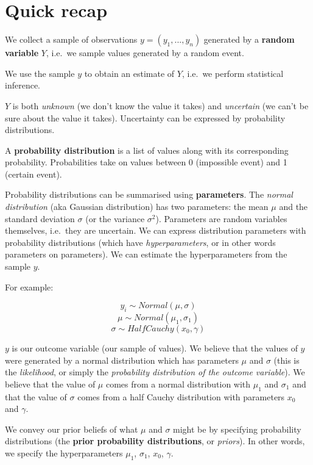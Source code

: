 \documentclass[
]{article}
\begin{document}
\hypertarget{quick-recap}{%
\section{Quick recap}\label{quick-recap}}

We collect a sample of observations \(y = (y_1, ..., y_n)\) generated by
a \textbf{random variable} \(Y\), i.e.~we sample values generated by a
random event.

We use the sample \(y\) to obtain an estimate of \(Y\), i.e.~we perform
statistical inference.

\(Y\) is both \emph{unknown} (we don't know the value it takes) and
\emph{uncertain} (we can't be sure about the value it takes).
Uncertainty can be expressed by probability distributions.

A \textbf{probability distribution} is a list of values along with its
corresponding probability. Probabilities take on values between 0
(impossible event) and 1 (certain event).

Probability distributions can be summarised using \textbf{parameters}.
The \emph{normal distribution} (aka Gaussian distribution) has two
parameters: the mean \(\mu\) and the standard deviation \(\sigma\) (or
the variance \(\sigma^2\)). Parameters are random variables themselves,
i.e.~they are uncertain. We can express distribution parameters with
probability distributions (which have \emph{hyperparameters}, or in
other words parameters on parameters). We can estimate the
hyperparameters from the sample \(y\).

For example:

\[ y_i \sim Normal(\mu, \sigma) \] \[ \mu \sim Normal(\mu_1, \sigma_1)\]
\[ \sigma \sim HalfCauchy(x_0, \gamma)\]

\(y\) is our outcome variable (our sample of values). We believe that
the values of \(y\) were generated by a normal distribution which has
parameters \(\mu\) and \(\sigma\) (this is the \emph{likelihood}, or
simply the \emph{probability distribution of the outcome variable}). We
believe that the value of \(\mu\) comes from a normal distribution with
\(\mu_1\) and \(\sigma_1\) and that the value of \(\sigma\) comes from a
half Cauchy distribution with parameters \(x_0\) and \(\gamma\).

We convey our prior beliefs of what \(\mu\) and \(\sigma\) might be by
specifying probability distributions (the \textbf{prior probability
distributions}, or \emph{priors}). In other words, we specify the
hyperparameters \(\mu_1\), \(\sigma_1\), \(x_0\), \(\gamma\).
\end{document}
